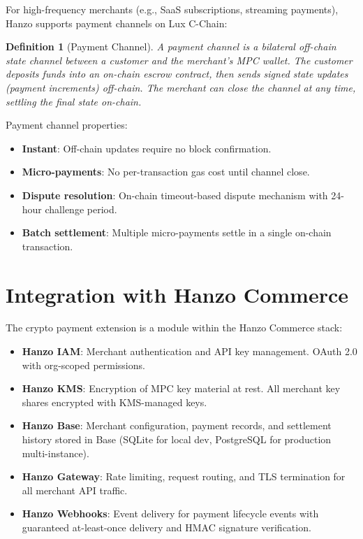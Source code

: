 \documentclass[11pt]{article}
\newtheorem{definition}{Definition}[section]
\begin{document}
For high-frequency merchants (e.g., SaaS subscriptions, streaming
payments), Hanzo supports payment channels on Lux C-Chain:

\begin{definition}[Payment Channel]
A payment channel is a bilateral off-chain state channel between a
customer and the merchant's MPC wallet. The customer deposits funds into
an on-chain escrow contract, then sends signed state updates (payment
increments) off-chain. The merchant can close the channel at any time,
settling the final state on-chain.
\end{definition}

Payment channel properties:
\begin{itemize}[leftmargin=1.4em]
    \item \textbf{Instant}: Off-chain updates require no block
    confirmation.
    \item \textbf{Micro-payments}: No per-transaction gas cost until
    channel close.
    \item \textbf{Dispute resolution}: On-chain timeout-based dispute
    mechanism with 24-hour challenge period.
    \item \textbf{Batch settlement}: Multiple micro-payments settle in
    a single on-chain transaction.
\end{itemize}

\section{Integration with Hanzo Commerce}
\label{sec:integration}

The crypto payment extension is a module within the Hanzo Commerce stack:

\begin{itemize}[leftmargin=1.4em]
    \item \textbf{Hanzo IAM}: Merchant authentication and API key
    management. OAuth 2.0 with org-scoped permissions.
    \item \textbf{Hanzo KMS}: Encryption of MPC key material at rest.
    All merchant key shares encrypted with KMS-managed keys.
    \item \textbf{Hanzo Base}: Merchant configuration, payment records,
    and settlement history stored in Base (SQLite for local dev,
    PostgreSQL for production multi-instance).
    \item \textbf{Hanzo Gateway}: Rate limiting, request routing, and
    TLS termination for all merchant API traffic.
    \item \textbf{Hanzo Webhooks}: Event delivery for payment lifecycle
    events with guaranteed at-least-once delivery and HMAC signature
    verification.
\end{itemize}
\end{document}
